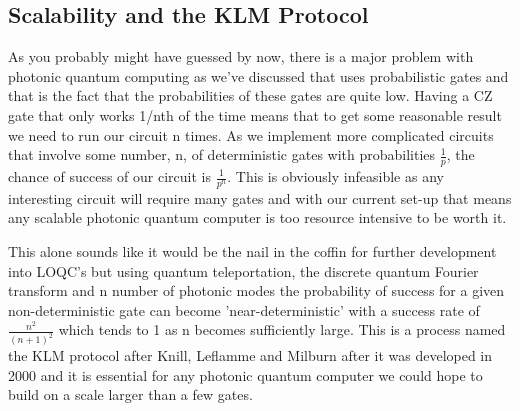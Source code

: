 \subsection{Scalability and the KLM Protocol}
As you probably might have guessed by now, there is a major problem with photonic quantum computing as we've discussed that uses probabilistic gates and that is the fact that the probabilities of these gates are quite low. Having a CZ gate that only works 1/nth of the time means that to get some reasonable result we need to run our circuit n times. As we implement more complicated circuits that involve some number, n, of deterministic gates with probabilities $\frac{1}{p}$, the chance of success of our circuit is $\frac{1}{p^n}$. This is obviously infeasible as any interesting circuit will require many gates and with our current set-up that means any scalable photonic quantum computer is too resource intensive to be worth it. \par
This alone sounds like it would be the nail in the coffin for further development into LOQC's but using quantum teleportation, the discrete quantum Fourier transform and n number of photonic modes the probability of success for a given non-deterministic gate can become 'near-deterministic' with a success rate of $\frac{n^2}{(n+1)^2}$ which tends to 1 as n becomes sufficiently large. This is a process named the KLM protocol after Knill, Leflamme and Milburn after it was developed in 2000 and it is essential for any photonic quantum computer we could hope to build on a scale larger than a few gates.

